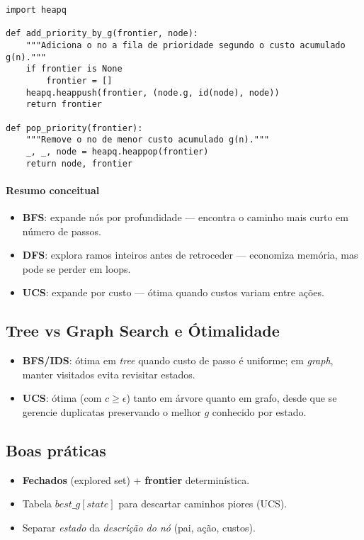 \documentclass[9pt,a4paper]{extarticle}
\begin{document}
\begin{lstlisting}
import heapq

def add_priority_by_g(frontier, node):
    """Adiciona o no a fila de prioridade segundo o custo acumulado g(n)."""
    if frontier is None
        frontier = []
    heapq.heappush(frontier, (node.g, id(node), node))
    return frontier

def pop_priority(frontier):
    """Remove o no de menor custo acumulado g(n)."""
    _, _, node = heapq.heappop(frontier)
    return node, frontier
\end{lstlisting}

\paragraph{Resumo conceitual}
\begin{itemize}
  \item \textbf{BFS}: expande nós por profundidade — encontra o caminho mais curto em número de passos.
  \item \textbf{DFS}: explora ramos inteiros antes de retroceder — economiza memória, mas pode se perder em loops.
  \item \textbf{UCS}: expande por custo — ótima quando custos variam entre ações.
\end{itemize}

\subsection*{Tree vs Graph Search e Ótimalidade} 
  
  \begin{itemize} 
    \item \textbf{BFS/IDS}: ótima em \textit{tree} quando custo de passo é uniforme; em \textit{graph}, manter visitados evita revisitar estados. 
    \item \textbf{UCS}: ótima (com $c\ge \epsilon$) tanto em árvore quanto em grafo, desde que se gerencie duplicatas preservando o melhor $g$ conhecido por estado. 
  \end{itemize} \subsection*{Boas práticas} \begin{itemize} \item \textbf{Fechados} (explored set) + \textbf{frontier} determinística. \item Tabela $best\_g[state]$ para descartar caminhos piores (UCS). \item Separar \textit{estado} da \textit{descrição do nó} (pai, ação, custos). \end{itemize}
\end{document}
